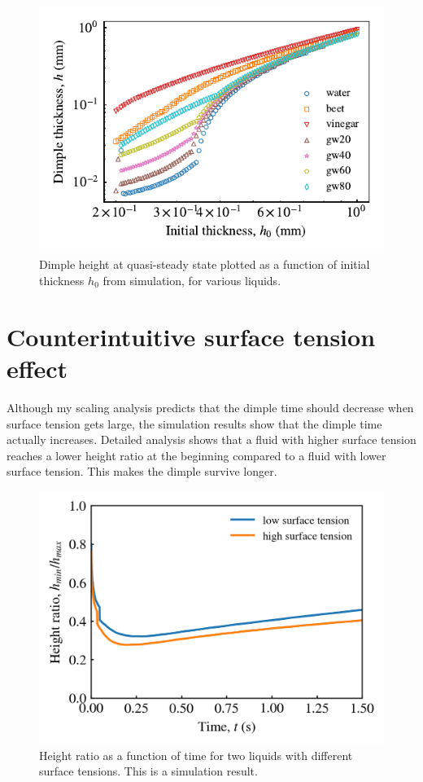 \documentclass[aps,pre,onecolumn,superscriptaddress,notitlepage,10pt]{revtex4-2}
\begin{document}
\begin{figure}[ht]
    \centering
    \includegraphics[width=\linewidth]{Figures/dimple_thickness}
    \caption{
    Dimple height at quasi-steady state plotted as a function of initial thickness $h_0$ from simulation, for various liquids. 
    }
    \label{fig:dimple-thickness-relation}
\end{figure}

\newpage

\section{Counterintuitive surface tension effect}

Although my scaling analysis predicts that the dimple time should decrease when surface tension gets large, the simulation results show that the dimple time actually increases. Detailed analysis shows that a fluid with higher surface tension reaches a lower height ratio at the beginning compared to a fluid with lower surface tension. This makes the dimple survive longer.

\begin{figure}[ht]
    \centering
    \includegraphics[width=\linewidth]{Figures/surface_tension_effect.png}
    \caption{
    Height ratio as a function of time for two liquids with different surface tensions. This is a simulation result.
    }
    \label{fig:surface-tension-effect}
\end{figure}
\end{document}
